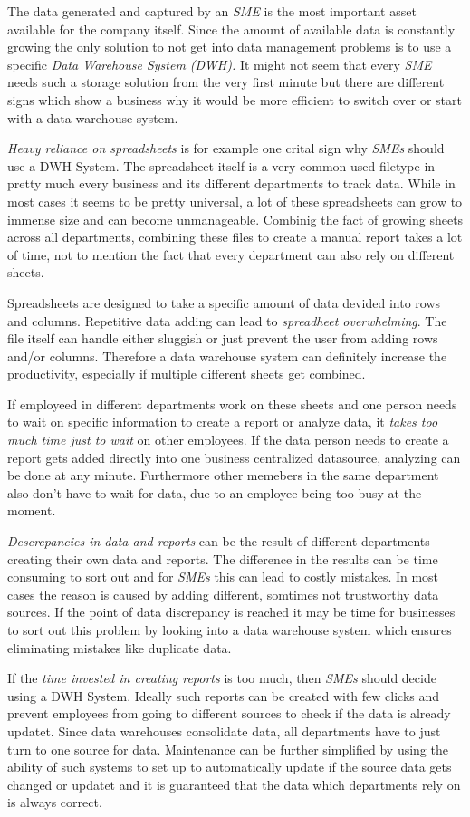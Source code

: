 \documentclass[../paper.tex]{subfiles}
\begin{document}
The data generated and captured by an \textit{SME} is the most important asset available for the company itself. Since the amount of available
data is constantly growing the only solution to not get into data management problems is to use a specific \textit{Data Warehouse System (DWH).}
It might not seem that every \textit{SME} needs such a storage solution from the very first minute but there are different signs which show a business
why it would be more efficient to switch over or start with a data warehouse system.

\textit{Heavy reliance on spreadsheets} is for example one crital sign why \textit{SMEs} should use a DWH System. The spreadsheet itself is a very
common used filetype in pretty much every business and its different departments to track data. While in most cases it seems to be pretty universal,
a lot of these spreadsheets can grow to immense size and can become unmanageable. Combinig the fact of growing sheets across all departments, combining
these files to create a manual report takes a lot of time, not to mention the fact that every department can also rely on different sheets.

Spreadsheets are designed to take a specific amount of data devided into rows and columns. Repetitive data adding can lead to
\textit{spreadheet overwhelming}. The file itself can handle either sluggish or just prevent the user from adding rows and/or columns. Therefore a
data warehouse system can definitely increase the productivity, especially if multiple different sheets get combined.

If employeed in different departments work on these sheets and one person needs to wait on specific information to create a report or 
analyze data, it \textit{takes too much time just to wait} on other employees. If the data person needs to create a report gets added directly into one
business centralized datasource, analyzing can be done at any minute. Furthermore other memebers in the same department also don't have to wait for
data, due to an employee being too busy at the moment.

\textit{Descrepancies in data and reports} can be the result of different departments creating their own data and reports. The difference in the results
can be time consuming to sort out and for \textit{SMEs} this can lead to costly mistakes. In most cases the reason is caused by adding different,
somtimes not trustworthy data sources. If the point of data discrepancy is reached it may be time for businesses to sort out this problem by looking
into a data warehouse system which ensures eliminating mistakes like duplicate data.

If the \textit{time invested in creating reports} is too much, then \textit{SMEs} should decide using a DWH System. Ideally such reports can be created
with few clicks and prevent employees from going to different sources to check if the data is already updatet. Since data warehouses consolidate data,
all departments have to just turn to one source for data. Maintenance can be further simplified by using the ability of such systems to set up to
automatically update if the source data gets changed or updatet and it is guaranteed that the data which departments rely on is always correct.
\end{document}
